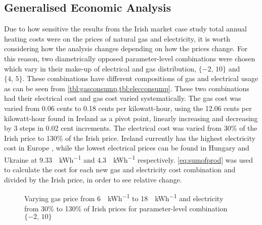 \subsection{Generalised Economic Analysis}
Due to how sensitive the results from the Irish market case study total annual heating costs were on the prices of natural gas and electricity, it is worth considering how the analysis changes depending on how the prices change. For this reason, two diametrically opposed parameter-level combinations were chosen which vary in their make-up of electrical and gas distribution, $\{-2\text{, }10\}$ and $\{4\text{, }5\}$. These combinations have different compositions of gas and electrical usage as can be seen from \cref{tbl:gasconsump,tbl:elecconsump}. These two combinations had their electrical cost and gas cost varied systematically. The gas cost was varied from 0.06 cents to 0.18 cents per kilowatt-hour, using the 12.06 cents per kilowatt-hour found in Ireland as a pivot point, linearly increasing and decreasing by 3 steps in 0.02 cent increments. The electrical cost was varied from 30\% of the Irish price to 130\% of the Irish price. Ireland currently has the highest electricity cost in Europe \cite{household_energy_price_index_price_nodate}, while the lowest electrical prices can be found in Hungary and Ukraine at \qty{9.33}{\cents\per\kWh} and \qty{4.3}{\cents\per\kWh} respectively. \cref{eq:sumofprod} was used to calculate the cost for each new gas and electricity cost combination and divided by the Irish price, in order to see relative change. 

\begin{figure}[htb]
    \centering
    \caption{Varying gas price from \qty{6}{\cents\per\kWh} to \qty{18}{\cents\per\kWh} and electricity from 30\% to 130\% of Irish prices for parameter-level combination $\{-2\text{, }10\}$}
    \label{fig:minus210cost}
\end{figure}

